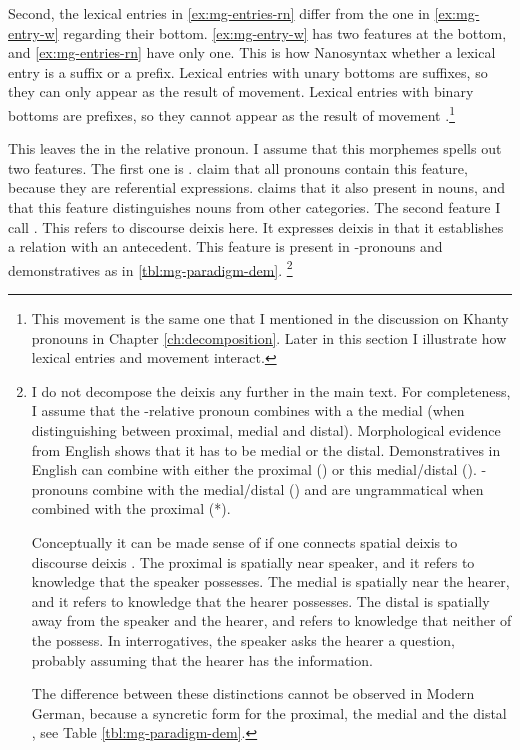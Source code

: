 Second, the lexical entries in \ref{ex:mg-entries-rn} differ from the one in \ref{ex:mg-entry-w} regarding their bottom. \ref{ex:mg-entry-w} has two features at the bottom, and \ref{ex:mg-entries-rn} have only one.
This is how Nanosyntax whether a lexical entry is a suffix or a prefix. Lexical entries with unary bottoms are suffixes, so they can only appear as the result of movement. Lexical entries with binary bottoms are prefixes, so they cannot appear as the result of movement \citep{starke2018}.\footnote{
This movement is the same one that I mentioned in the discussion on Khanty pronouns in Chapter \ref{ch:decomposition}. Later in this section I illustrate how lexical entries and movement interact.
}

This leaves the  in the relative pronoun. I assume that this morphemes spells out two features. The first one is . \citet{harley2002} claim that all pronouns contain this feature, because they are referential expressions. \citet{baker2003} claims that it also present in nouns, and that this feature distinguishes nouns from other categories.
The second feature I call . This refers to discourse deixis here.
It expresses deixis in that it establishes a relation with an antecedent.
This feature is present in -pronouns and demonstratives as in \ref{tbl:mg-paradigm-dem}. \footnote{
I do not decompose the deixis any further in the main text. For completeness, I assume that the -relative pronoun combines with a the medial (when distinguishing between proximal, medial and distal). Morphological evidence from English shows that it has to be medial or the distal. Demonstratives in English can combine with either the proximal () or this medial/distal (). -pronouns combine with the medial/distal () and are ungrammatical when combined with the proximal (*).

Conceptually it can be made sense of if one connects spatial deixis to discourse deixis \citep{colasanti2019}. The proximal is spatially near speaker, and it refers to knowledge that the speaker possesses. The medial is spatially near the hearer, and it refers to knowledge that the hearer possesses. The distal is spatially away from the speaker and the hearer, and refers to knowledge that neither of the possess. In interrogatives, the speaker asks the hearer a question, probably assuming that the hearer has the information.

The difference between these distinctions cannot be observed in Modern German, because a syncretic form for the proximal, the medial and the distal , see Table \ref{tbl:mg-paradigm-dem}.
}

